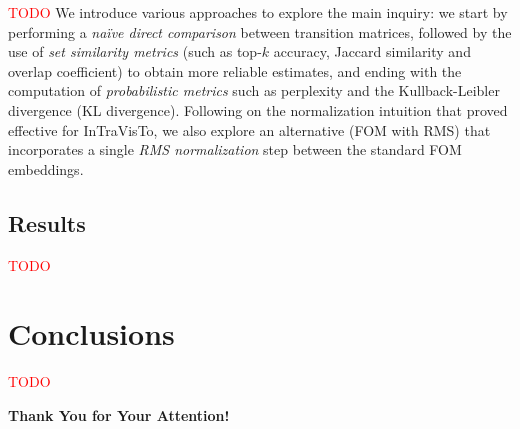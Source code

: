 \documentclass[aspectratio=169, 12pt]{beamer}
\begin{document}
    \begin{frame}[plain]{}
        \textcolor{red}{TODO}
        We introduce various approaches to explore the main inquiry: we start by performing a \emph{naïve direct comparison} between transition matrices, followed by the use of \emph{set similarity metrics} (such as top-$k$ accuracy, Jaccard similarity and overlap coefficient) to obtain more reliable estimates, and ending with the computation of \emph{probabilistic metrics} such as perplexity and the Kullback-Leibler divergence (KL divergence).
        Following on the normalization intuition that proved effective for InTraVisTo, we also explore an alternative (FOM with RMS) that incorporates a single \emph{RMS normalization} step between the standard FOM embeddings.
    \end{frame}

    \subsection{Results}
    \begin{frame}{}
        \textcolor{red}{TODO}
    \end{frame}

    \section{Conclusions}

    \begin{frame}{}
        \textcolor{red}{TODO}
    \end{frame}

    \begin{frame}[plain]{}
        \vspace{2cm}
        \begin{minipage}[t][\baselineskip]{\textwidth}
            {
                \center
                \Large\bf Thank You for Your Attention! \par
            }
        \end{minipage}
    \end{frame}
\end{document}
